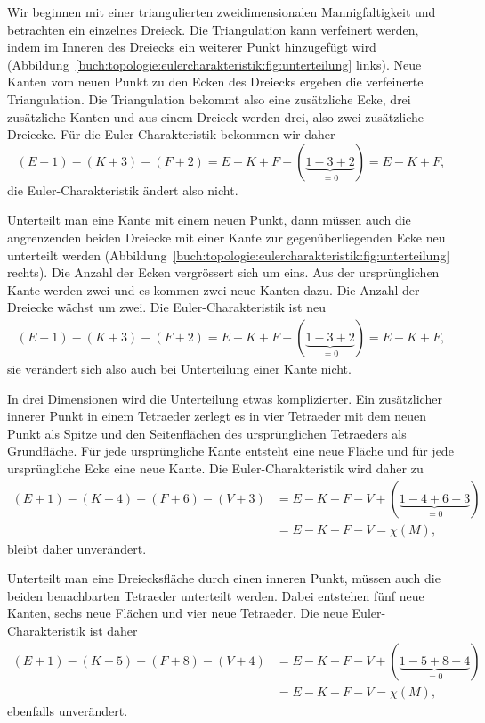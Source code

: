 Wir beginnen mit einer triangulierten zweidimensionalen Mannigfaltigkeit
und betrachten ein einzelnes Dreieck.
Die Triangulation kann verfeinert werden, indem im Inneren des
Dreiecks ein weiterer Punkt hinzugefügt wird
(Abbildung~\ref{buch:topologie:eulercharakteristik:fig:unterteilung} links).
Neue Kanten vom neuen Punkt zu den Ecken des Dreiecks ergeben die
verfeinerte Triangulation.
Die Triangulation bekommt also eine zusätzliche Ecke, drei zusätzliche
Kanten und aus einem Dreieck werden drei, also zwei zusätzliche Dreiecke.
Für die Euler-Charakteristik bekommen wir daher
\[
(E+1) - (K+3) - (F+2)
=
E-K+F+(\underbrace{1-3+2}_{\displaystyle=0})
=
E-K+F,
\]
die Euler-Charakteristik ändert also nicht.

Unterteilt man eine Kante mit einem neuen Punkt, dann müssen auch
die angrenzenden beiden Dreiecke mit einer Kante zur gegenüberliegenden
Ecke neu unterteilt werden
(Abbildung~\ref{buch:topologie:eulercharakteristik:fig:unterteilung} rechts).
Die Anzahl der Ecken vergrössert sich um eins.
Aus der ursprünglichen Kante werden zwei und es kommen zwei neue Kanten
dazu.
Die Anzahl der Dreiecke wächst um zwei.
Die Euler-Charakteristik ist neu
\begin{align*}
(E+1) - (K+3) - (F+2)
=
E-K+F +(\underbrace{1-3+2}_{\displaystyle=0})
=
E-K+F,
\end{align*}
sie verändert sich also auch bei Unterteilung einer Kante nicht.

In drei Dimensionen wird die Unterteilung etwas komplizierter.
Ein zusätzlicher innerer Punkt in einem Tetraeder zerlegt
es in vier Tetraeder mit dem neuen Punkt als Spitze und den
Seitenflächen des ursprünglichen Tetraeders als Grundfläche.
Für jede ursprüngliche Kante entsteht eine neue Fläche und
für jede ursprüngliche Ecke eine neue Kante.
Die Euler-Charakteristik wird daher zu
\begin{align*}
(E+1) - (K+4) + (F+6) - (V+3)
&=
E-K+F-V
+
(\underbrace{1-4+6-3}_{\displaystyle=0})
\\
&=
E-K+F-V
=
\chi(M),
\end{align*}
bleibt daher unverändert.

Unterteilt man eine Dreiecksfläche durch einen inneren Punkt,
müssen auch die beiden benachbarten Tetraeder unterteilt werden.
Dabei entstehen fünf neue Kanten, sechs neue Flächen und vier
neue Tetraeder.
Die neue Euler-Charakteristik ist daher
\begin{align*}
(E+1) - (K+5) + (F+8) - (V+4)
&=
E-K+F-V
+(\underbrace{1-5+8-4}_{\displaystyle=0})
\\
&=
E-K+F-V
=
\chi(M),
\end{align*}
ebenfalls unverändert.

